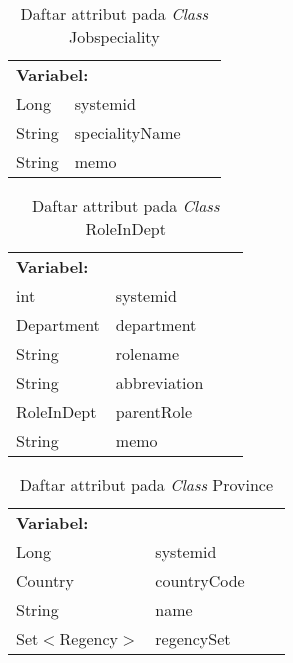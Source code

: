 \begin{table}[H]
	\caption{Daftar attribut pada \textit{Class} Jobspeciality}
	\centering
	\small
	\begin{adjustbox}{width=1\textwidth}	
		\begin{tabular}{|p{5cm} p{3.1cm} p{2cm} p{2.1cm}|}
			\hline
			\multicolumn{2}{|l}{\textbf{Variabel:}}&\multicolumn{2}{l|}{\textbf{}}\\
			Long&systemid&&\\
			String&specialityName&&\\
			String&memo&&\\
			\hline
		\end{tabular}
	\end{adjustbox}
\end{table}
\begin{table}[H]
	\caption{Daftar attribut pada \textit{Class} RoleInDept}
	\centering
	\small
	\begin{adjustbox}{width=1\textwidth}	
		\begin{tabular}{|p{5cm} p{3.1cm} p{2cm} p{2.1cm}|}
			\hline
			\multicolumn{2}{|l}{\textbf{Variabel:}}&\multicolumn{2}{l|}{\textbf{}}\\
			int&systemid&&\\
			Department&department&&\\
			String&rolename&&\\
			String&abbreviation&&\\
			RoleInDept&parentRole&&\\
			String&memo&&\\
			\hline
		\end{tabular}
	\end{adjustbox}
\end{table}
\begin{table}[H]
	\caption{Daftar attribut pada \textit{Class} Province}
	\centering
	\small
	\begin{adjustbox}{width=1\textwidth}	
		\begin{tabular}{|p{5cm} p{3.1cm} p{2cm} p{2.1cm}|}
			\hline
			\multicolumn{2}{|l}{\textbf{Variabel:}}&\multicolumn{2}{l|}{\textbf{}}\\
			Long&systemid&&\\
			Country&countryCode&&\\
			String&name&&\\
			Set$<$Regency$>$&regencySet&&\\
			\hline
		\end{tabular}
	\end{adjustbox}
\end{table}
